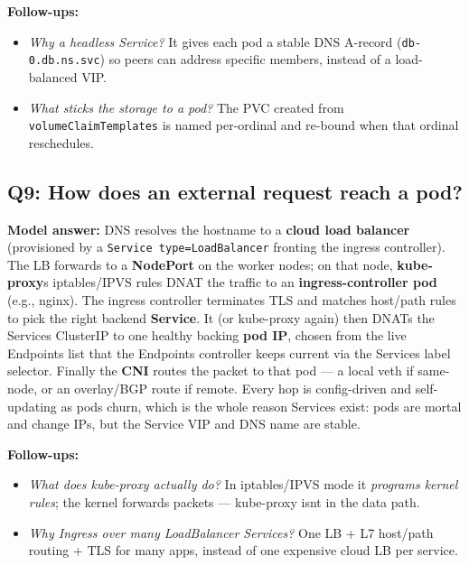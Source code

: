 \documentclass[11pt]{article}
\providecommand{\tightlist}{\setlength{\itemsep}{1pt}\setlength{\parskip}{0pt}}
\begin{document}
\textbf{Follow-ups:}

\begin{itemize}
\tightlist
\item
  \emph{Why a headless Service?} It gives each pod a stable DNS A-record (\texttt{db-0.db.ns.svc}) so peers can address specific members, instead of a load-balanced VIP.
\item
  \emph{What sticks the storage to a pod?} The PVC created from \texttt{volumeClaimTemplates} is named per-ordinal and re-bound when that ordinal reschedules.
\end{itemize}

\subsection{Q9: How does an external request reach a pod?}\label{q9-how-does-an-external-request-reach-a-pod}

\textbf{Model answer:}
DNS resolves the hostname to a \textbf{cloud load balancer} (provisioned by a \texttt{Service\ type=LoadBalancer} fronting the ingress controller). The LB forwards to a \textbf{NodePort} on the worker nodes; on that node, \textbf{kube-proxy}\textquotesingle s iptables/IPVS rules DNAT the traffic to an \textbf{ingress-controller pod} (e.g., nginx). The ingress controller terminates TLS and matches host/path rules to pick the right backend \textbf{Service}. It (or kube-proxy again) then DNATs the Service\textquotesingle s ClusterIP to one healthy backing \textbf{pod IP}, chosen from the live Endpoints list that the Endpoints controller keeps current via the Service\textquotesingle s label selector. Finally the \textbf{CNI} routes the packet to that pod --- a local veth if same-node, or an overlay/BGP route if remote. Every hop is config-driven and self-updating as pods churn, which is the whole reason Services exist: pods are mortal and change IPs, but the Service VIP and DNS name are stable.

\textbf{Follow-ups:}

\begin{itemize}
\tightlist
\item
  \emph{What does kube-proxy actually do?} In iptables/IPVS mode it \emph{programs kernel rules}; the kernel forwards packets --- kube-proxy isn\textquotesingle t in the data path.
\item
  \emph{Why Ingress over many LoadBalancer Services?} One LB + L7 host/path routing + TLS for many apps, instead of one expensive cloud LB per service.
\end{itemize}
\end{document}
